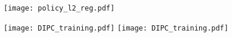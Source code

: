 \begin{figure}
	\centering
	\texttt{[image: policy\_l2\_reg.pdf]}
\end{figure}
\begin{figure}
	\texttt{[image: DIPC\_training.pdf]}
	\texttt{[image: DIPC\_training.pdf]}
\end{figure}
